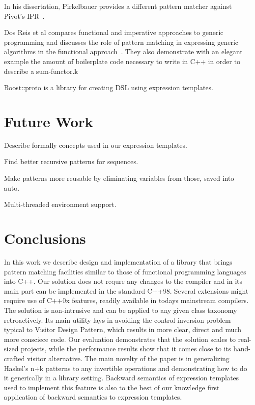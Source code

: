 \documentclass[submission,copyright]{eptcs}
\begin{document}
In his dissertation, Pirkelbauer provides a different pattern matcher against 
Pivot's IPR~\cite{PirkelbauerThesis}.

Dos Reis et al compares functional and imperative approaches to generic 
programming and discusses the role of pattern matching in expressing generic 
algorithms in the functional approach~\cite{dos_reis:05:what_is_gp}. They also 
demonstrate with an elegant example the amount of boilerplate code necessary to 
write in C++ in order to describe a sum-functor.k

Boost::proto is a library for creating DSL using expression templates.

\section{Future Work} %
\label{sec:fw}

Describe formally concepts used in our expression templates.

Find better recursive patterns for sequences.

Make patterns more reusable by eliminating variables from those, saved into 
auto.

Multi-threaded environment support.

\section{Conclusions} %
\label{sec:cc}

In this work we describe design and implementation of a library that brings 
pattern matching facilities similar to those of functional programming languages 
into C++. Our solution does not requre any changes to the compiler and in its 
main part can be implemented in the standard C++98. Several extensions might 
require use of C++0x features, readily available in todays mainstream compilers.
The solution is non-intrusive and can be applied to any given class taxonomy 
retroactively. Its main utility lays in avoiding the control inversion problem 
typical to Visitor Design Pattern, which results in more clear, direct and much 
more consciece code. Our evaluation demonstrates that the solution scales to 
real-sized projects, while the performance results show that it comes close to 
its hand-crafted visitor alternative. The main novelty of the paper is in 
generalizing Haskel's n+k patterns to any invertible operations and 
demonstrating how to do it generically in a library setting. Backward semantics 
of expression templates used to implement this feature is also to the best of 
our knowledge first application of backward semantics to expression templates.
\end{document}
